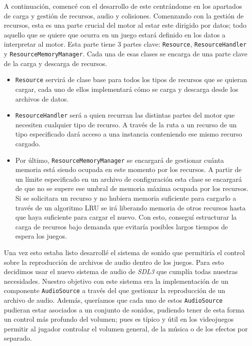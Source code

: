 A continuación, comencé con el desarrollo de este centrándome en los apartados de carga y gestión de recursos, audio y colisiones. Comenzando con la gestión de recursos, esta es una parte crucial del motor al estar este dirigido por datos; todo aquello que se quiere que ocurra en un juego estará definido en los datos a interpretar al motor.
Esta parte tiene 3 partes clave: \texttt{Resource}, \texttt{ResourceHandler} y \texttt{ResourceMemoryManager}. Cada una de esas clases se encarga de una parte clave de la carga y descarga de recursos. 
\begin{itemize}
	\item \texttt{Resource} servirá de clase base para todos los tipos de recursos que se quieran cargar, cada uno de ellos implementará cómo se carga y descarga desde los archivos de datos.
	\item \texttt{ResourceHandler} será a quien recurran las distintas partes del motor que necesiten cualquier tipo de recurso. A través de la ruta a un recurso de un tipo especificado dará acceso a una instancia conteniendo ese mismo recurso cargado.
	\item Por último, \texttt{ResourceMemoryManager} se encargará de gestionar cuánta memoria está siendo ocupada en este momento por los recursos. A partir de un límite especificado en un archivo de configuración esta clase se encargará de que no se supere ese umbral de memoria máxima ocupada por los recursos. Si se solicitara un recurso y no hubiera memoria suficiente para cargarlo a través de un algoritmo LRU se irá liberando memoria de otros recursos hasta que haya suficiente para cargar el nuevo. Con esto, conseguí estructurar la carga de recursos bajo demanda que evitaría posibles largos tiempos de espera los juegos.
\end{itemize}

\medskip

Una vez esto estaba listo desarrollé el sistema de sonido que permitiría el control sobre la reproducción de archivos de audio dentro de los juegos. Para esto decidimos usar el nuevo sistema de audio de \textit{SDL3} que cumplía todas nuestras necesidades. Nuestro objetivo con este sistema era la implementación de un componente \texttt{AudioSource} a través del que gestionar la reproducción de un archivo de audio. Además, queríamos que cada uno de estos \texttt{AudioSource} pudieran estar asociados a un conjunto de sonidos, pudiendo tener de esta forma un control más profundo del volumen; pues es típico y útil en los videojuegos permitir al jugador controlar el volumen general, de la música o de los efectos por separado.

